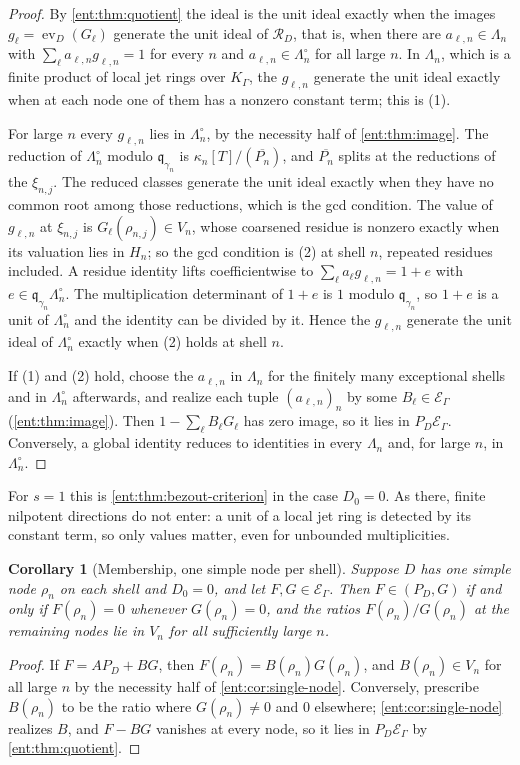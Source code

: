 \documentclass[11pt]{article}
\theoremstyle{plain}
\theoremstyle{plain}
\theoremstyle{plain}
\newtheorem{corollary}[corollary]{Corollary}
\theoremstyle{definition}
\theoremstyle{definition}
\theoremstyle{definition}
\theoremstyle{definition}
\theoremstyle{remark}
\newcommand{\K}{K_\Gamma}\newcommand{\KD}{K_\Delta}
\newcommand{\E}{\mathcal E_\Gamma}
\DeclareMathOperator{\ev}{ev}
\newcommand{\RD}{\mathcal R_D}\newcommand{\Ucal}{\mathcal U}
\begin{document}
\begin{proof}
By \cref{ent:thm:quotient} the ideal is the unit ideal exactly when the images
$g_\ell=\ev_D(G_\ell)$ generate the unit ideal of $\RD$, that is, when there
are $a_{\ell,n}\in\Lambda_n$ with $\sum_\ell a_{\ell,n}g_{\ell,n}=1$ for every
$n$ and $a_{\ell,n}\in\Lambda_n^\circ$ for all large $n$. In $\Lambda_n$,
which is a finite product of local jet rings over $\K$, the $g_{\ell,n}$
generate the unit ideal exactly when at each node one of them has a nonzero
constant term; this is (1).

For large $n$ every $g_{\ell,n}$ lies in $\Lambda_n^\circ$, by the necessity
half of \cref{ent:thm:image}. The reduction of $\Lambda_n^\circ$ modulo
$\mathfrak q_{\gamma_n}$ is $\kappa_n[T]/(\overline{P_n})$, and
$\overline{P_n}$ splits at the reductions of the $\xi_{n,j}$. The reduced
classes generate the unit ideal exactly when they have no common root among
those reductions, which is the gcd condition. The value of $g_{\ell,n}$ at
$\xi_{n,j}$ is $G_\ell(\rho_{n,j})\in V_n$, whose coarsened residue is nonzero
exactly when its valuation lies in $H_n$; so the gcd condition is (2) at
shell $n$, repeated residues included. A residue identity lifts
coefficientwise to $\sum_\ell a_\ell g_{\ell,n}=1+e$ with
$e\in\mathfrak q_{\gamma_n}\Lambda_n^\circ$. The multiplication determinant of
$1+e$ is $1$ modulo $\mathfrak q_{\gamma_n}$, so $1+e$ is a unit of
$\Lambda_n^\circ$ and the identity can be divided by it. Hence the
$g_{\ell,n}$ generate the unit ideal of $\Lambda_n^\circ$ exactly when (2)
holds at shell $n$.

If (1) and (2) hold, choose the $a_{\ell,n}$ in $\Lambda_n$ for the finitely
many exceptional shells and in $\Lambda_n^\circ$ afterwards, and realize each
tuple $(a_{\ell,n})_n$ by some $B_\ell\in\E$ (\cref{ent:thm:image}). Then
$1-\sum_\ell B_\ell G_\ell$ has zero image, so it lies in $P_D\E$.
Conversely, a global identity reduces to identities in every $\Lambda_n$ and,
for large $n$, in $\Lambda_n^\circ$.
\end{proof}

For $s=1$ this is \cref{ent:thm:bezout-criterion} in the case $D_0=0$. As
there, finite nilpotent directions do not enter: a unit of a local jet ring
is detected by its constant term, so only values matter, even for unbounded
multiplicities.

\begin{corollary}[Membership, one simple node per shell]
\label{ent:sm:cor:membership}
Suppose $D$ has one simple node $\rho_n$ on each shell and $D_0=0$, and let
$F,G\in\E$. Then $F\in(P_D,G)$ if and only if $F(\rho_n)=0$ whenever
$G(\rho_n)=0$, and the ratios $F(\rho_n)/G(\rho_n)$ at the remaining nodes lie
in $V_n$ for all sufficiently large $n$.
\end{corollary}
\begin{proof}
If $F=AP_D+BG$, then $F(\rho_n)=B(\rho_n)G(\rho_n)$, and $B(\rho_n)\in V_n$
for all large $n$ by the necessity half of \cref{ent:cor:single-node}.
Conversely, prescribe $B(\rho_n)$ to be the ratio where $G(\rho_n)\ne0$ and
$0$ elsewhere; \cref{ent:cor:single-node} realizes $B$, and $F-BG$ vanishes
at every node, so it lies in $P_D\E$ by \cref{ent:thm:quotient}.
\end{proof}
\end{document}
